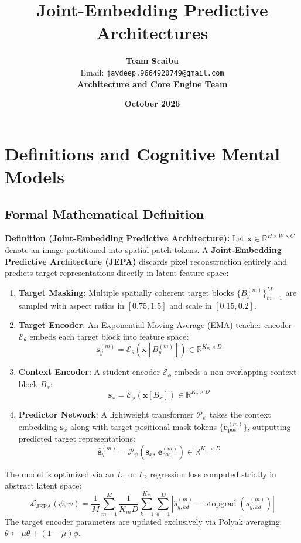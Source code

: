 \documentclass[11pt,a4paper]{article}
\title{\textbf{Joint-Embedding Predictive Architectures}}
\author{\textbf{Team Scaibu} \\ \small Email: \texttt{jaydeep.9664920749@gmail.com} \\ \small \textbf{Architecture and Core Engine Team}}
\date{\textbf{October 2026}}
\theoremstyle{definition}
\begin{document}
\maketitle

\section{Definitions and Cognitive Mental Models}

\subsection{Formal Mathematical Definition}
\textbf{Definition (Joint-Embedding Predictive Architecture):}
Let $\mathbf{x} \in \mathbb{R}^{H \times W \times C}$ denote an image partitioned into spatial patch tokens. A \textbf{Joint-Embedding Predictive Architecture (JEPA)} discards pixel reconstruction entirely and predicts target representations directly in latent feature space:
\begin{enumerate}
    \item \textbf{Target Masking}: Multiple spatially coherent target blocks $\{B_y^{(m)}\}_{m=1}^M$ are sampled with aspect ratios in $[0.75, 1.5]$ and scale in $[0.15, 0.2]$.
    \item \textbf{Target Encoder}: An Exponential Moving Average (EMA) teacher encoder $\mathcal{E}_\theta$ embeds each target block into feature space:
    {\boldmath
    \begin{equation}
    \mathbf{s}_y^{(m)} = \mathcal{E}_\theta\left( \mathbf{x}\left[ B_y^{(m)} \right] \right) \in \mathbb{R}^{K_m \times D}
    \end{equation}
    }
    \item \textbf{Context Encoder}: A student encoder $\mathcal{E}_\phi$ embeds a non-overlapping context block $B_x$:
    {\boldmath
    \begin{equation}
    \mathbf{s}_x = \mathcal{E}_\phi\left( \mathbf{x}\left[ B_x \right] \right) \in \mathbb{R}^{K_x \times D}
    \end{equation}
    }
    \item \textbf{Predictor Network}: A lightweight transformer $\mathcal{P}_\psi$ takes the context embedding $\mathbf{s}_x$ along with target positional mask tokens $\{\mathbf{e}_{\text{pos}}^{(m)}\}$, outputting predicted target representations:
    {\boldmath
    \begin{equation}
    \hat{\mathbf{s}}_y^{(m)} = \mathcal{P}_\psi\left( \mathbf{s}_x, \, \mathbf{e}_{\text{pos}}^{(m)} \right) \in \mathbb{R}^{K_m \times D}
    \end{equation}
    }
\end{enumerate}
The model is optimized via an $L_1$ or $L_2$ regression loss computed strictly in abstract latent space:
{\boldmath
\begin{equation}
\mathcal{L}_{\text{JEPA}}(\phi, \psi) = \frac{1}{M} \sum_{m=1}^M \frac{1}{K_m D} \sum_{k=1}^{K_m} \sum_{d=1}^D \left| \hat{s}_{y, kd}^{(m)} - \operatorname{stopgrad}(s_{y, kd}^{(m)}) \right|
\end{equation}
}
The target encoder parameters are updated exclusively via Polyak averaging: $\theta \gets \mu \theta + (1 - \mu)\phi$.
\end{document}
